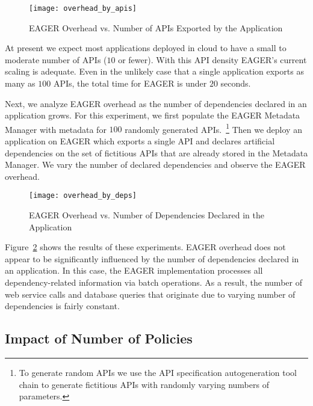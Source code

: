 \begin{figure}
\centering
\texttt{[image: overhead\_by\_apis]}
\caption{EAGER Overhead vs. Number of APIs Exported by the Application}
\label{fig:overhead_by_apis}
\end{figure}

At present we expect most applications deployed in cloud to have a small to 
moderate number of APIs ($10$ or fewer).  With this API density EAGER's current 
scaling is adequate.  Even in the
unlikely case that a single application exports as many as $100$ APIs,
the total time for EAGER is under $20$ seconds.

Next, we analyze EAGER overhead as the number of dependencies declared in
an application grows. For this experiment, we first populate the EAGER
Metadata Manager with metadata for $100$ randomly 
generated APIs.~\footnote{To generate random APIs we use the API specification
autogeneration tool chain to generate
fictitious APIs with randomly varying numbers of parameters.}
Then we
deploy an application on EAGER which exports a single API and declares
artificial dependencies on the set of fictitious 
APIs that are already stored in the Metadata Manager. We
vary the number of declared dependencies and observe the EAGER overhead.

\begin{figure}
\centering
\texttt{[image: overhead\_by\_deps]}
\caption{EAGER Overhead vs. Number of Dependencies Declared in the Application}
\label{fig:overhead_by_deps}
\end{figure}

Figure~\ref{fig:overhead_by_deps} shows the results of these experiments. 
EAGER overhead does not appear to be significantly
influenced by the number of dependencies declared in an application. 
In this case, the EAGER implementation processes
all dependency-related information via batch operations. 
As a result, the number of web service calls and database queries that originate 
due to varying number of dependencies is fairly constant. 

\subsection{Impact of Number of Policies}

